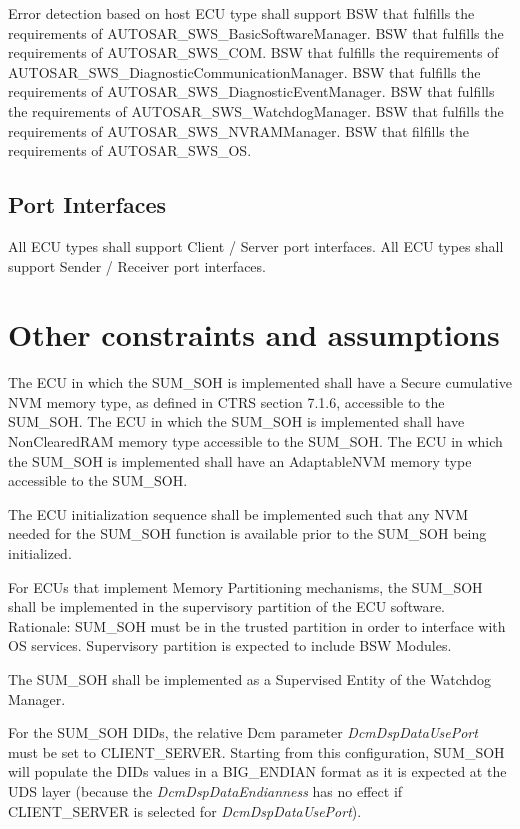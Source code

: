 Error detection based on host ECU type shall support BSW that fulfills the requirements of AUTOSAR_SWS_BasicSoftwareManager.
BSW that fulfills the requirements of AUTOSAR_SWS_COM.
BSW that fulfills the requirements of AUTOSAR_SWS_DiagnosticCommunicationManager.
BSW that fulfills the requirements of AUTOSAR_SWS_DiagnosticEventManager.
BSW that fulfills the requirements of AUTOSAR_SWS_WatchdogManager.
BSW that fulfills the requirements of AUTOSAR_SWS_NVRAMManager.
BSW that filfills the requirements of AUTOSAR_SWS_OS.


\subsection{Port Interfaces}
\label{sec:portinterfaces}
{
All ECU types shall support Client / Server port interfaces.
All ECU types shall support Sender / Receiver port interfaces.
}
{
}




\section{Other constraints and assumptions}
\label{sec:otherconstraint}
The ECU in which the SUM_SOH is implemented shall have a Secure cumulative NVM memory type, as defined in CTRS section 7.1.6, accessible to the SUM_SOH.
The ECU in which the SUM_SOH is implemented shall have NonClearedRAM memory type accessible to the SUM_SOH.
The ECU in which the SUM_SOH is implemented shall have an AdaptableNVM memory type accessible to the SUM_SOH.

The ECU initialization sequence shall be implemented such that any NVM needed for the SUM_SOH function is available prior to the SUM_SOH being initialized.

For ECUs that implement Memory Partitioning mechanisms, the SUM_SOH shall be implemented in the supervisory partition of the ECU software. Rationale: SUM_SOH must be in the trusted partition in order to interface with OS services. Supervisory partition is expected to include BSW Modules.

The SUM_SOH shall be implemented as a Supervised Entity of the Watchdog Manager.

For the SUM_SOH DIDs, the relative Dcm parameter \textit{DcmDspDataUsePort} must be set to CLIENT\_SERVER. Starting from this configuration,
SUM_SOH will populate the DIDs values in a BIG\_ENDIAN format as it is expected at the UDS layer (because the \textit{DcmDspDataEndianness}  has no effect if CLIENT\_SERVER is selected for \textit{DcmDspDataUsePort}).